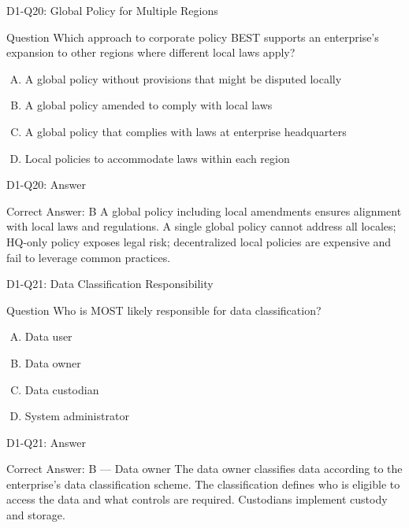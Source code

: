 \documentclass{beamer}
\begin{document}
	\begin{frame}{D1-Q20: Global Policy for Multiple Regions}
		\begin{block}{Question}
			Which approach to corporate policy BEST supports an enterprise's expansion to other regions where different local laws apply?
		\end{block}
		\begin{enumerate}[(A)]
			\item A global policy without provisions that might be disputed locally
			\item A global policy amended to comply with local laws
			\item A global policy that complies with laws at enterprise headquarters
			\item Local policies to accommodate laws within each region
		\end{enumerate}
	\end{frame}
	\begin{frame}{D1-Q20: Answer}
		\begin{block}{Correct Answer: B}
			A global policy including local amendments ensures alignment with local laws and regulations. A single global policy cannot address all locales; HQ-only policy exposes legal risk; decentralized local policies are expensive and fail to leverage common practices.
		\end{block}
	\end{frame}
	
	\begin{frame}{D1-Q21: Data Classification Responsibility}
		\begin{block}{Question}
			Who is MOST likely responsible for data classification?
		\end{block}
		\begin{enumerate}[(A)]
			\item Data user
			\item Data owner
			\item Data custodian
			\item System administrator
		\end{enumerate}
	\end{frame}
	\begin{frame}{D1-Q21: Answer}
		\begin{block}{Correct Answer: B --- Data owner}
			The data owner classifies data according to the enterprise's data classification scheme. The classification defines who is eligible to access the data and what controls are required. Custodians implement custody and storage.
		\end{block}
	\end{frame}
	
\end{document}
